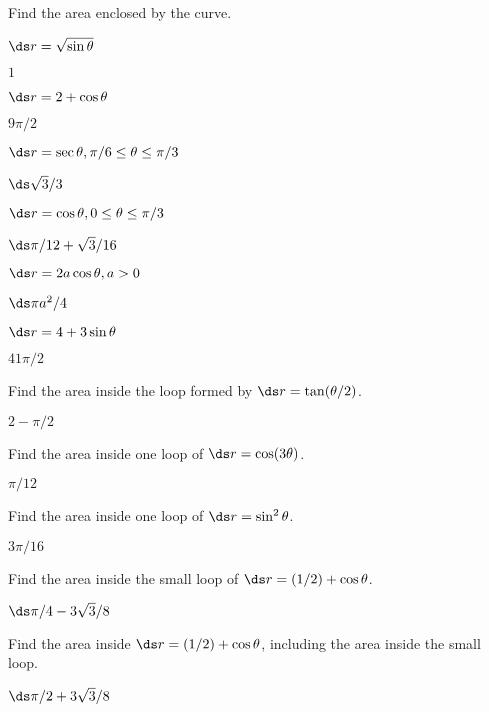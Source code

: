 \begin{exercises}

\noindent Find the area enclosed by the curve.

\twocol

\exercise $\ds r=\sqrt{\sin\theta}$
\begin{answer} $1$
\end{answer}

\exercise $\ds r=2+\cos\theta$
\begin{answer} $9\pi/2$
\end{answer}

\exercise $\ds r=\sec\theta, \pi/6\le\theta\le\pi/3$
\begin{answer} $\ds \sqrt3/3$
\end{answer}

\exercise $\ds r=\cos\theta, 0\le\theta\le\pi/3$
\begin{answer} $\ds \pi/12+\sqrt3/16$
\end{answer}

\exercise $\ds r=2a\cos\theta, a>0$
\begin{answer} $\ds \pi a^2/4$
\end{answer}

\exercise $\ds r=4+3\sin\theta$
\begin{answer} $41\pi/2$
\end{answer}

\endtwocol

\exercise Find the area inside the loop formed by
$\ds r=\tan(\theta/2)$.
\begin{answer} $2-\pi/2$
\end{answer}

\exercise Find the area inside one loop of $\ds r=\cos(3\theta)$.
\begin{answer} $\pi/12$
\end{answer}

\exercise Find the area inside one loop of $\ds r=\sin^2\theta$.
\begin{answer} $3\pi/16$
\end{answer}

\exercise Find the area inside the small loop of $\ds r=(1/2)+\cos\theta$.
\begin{answer} $\ds \pi/4-3\sqrt3/8$
\end{answer}

\exercise Find the area inside $\ds r=(1/2)+\cos\theta$, including the
area inside the small loop.
\begin{answer} $\ds \pi/2+3\sqrt3/8$
\end{answer}


\end{exercises}
